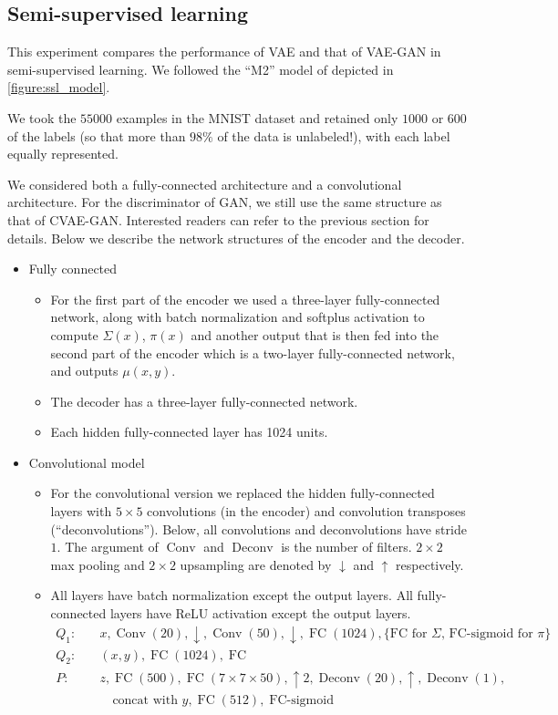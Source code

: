 \documentclass[10pt]{article}
\newcommand{\op}[1]{\operatorname{#1}}
\begin{document}
\subsection{Semi-supervised learning}

This experiment compares the performance of VAE and that of VAE-GAN in semi-supervised learning. We followed the ``M2'' model of \cite{kingma2014semi} depicted in \autoref{figure:ssl_model}. 

We took the $55000$ examples in the MNIST dataset and retained only $1000$ or $600$ of the labels (so that more than $98\%$ of the data is unlabeled!), with each label equally represented. 

We considered both a fully-connected architecture and a convolutional architecture. For the discriminator of GAN, we still use the same structure as that of CVAE-GAN. Interested readers can refer to the previous section for details. Below we describe the network structures of the encoder and the decoder. 
\begin{itemize}
	\item Fully connected
    \begin{itemize}
    	\item For the first part of the encoder we used a three-layer fully-connected network, along with batch normalization and softplus activation to compute $\Sigma(x)$, $\pi(x)$ and another output that is then fed into the second part of the encoder which is a two-layer fully-connected network, and outputs $\mu(x,y)$.
        \item The decoder has a three-layer fully-connected network.
        \item Each hidden fully-connected layer has 1024 units.
    \end{itemize}
    \item Convolutional model
    \begin{itemize}
    	\item For the convolutional version we replaced the hidden fully-connected layers with $5\times 5$ convolutions (in the encoder) and convolution transposes (``deconvolutions''). Below, all convolutions and deconvolutions have stride $1$. The argument of $\op{Conv}$ and $\op{Deconv}$ is the number of filters. $2\times 2$ max pooling and $2\times 2$ upsampling are denoted by $\downarrow$ and $\uparrow$ respectively.
        \item All layers have batch normalization except the output layers. All fully-connected layers have ReLU activation except the output layers.
        \begin{align}
        Q_1:& \quad x,\op{Conv}(20), \downarrow, \op{Conv}(50), \downarrow, \op{FC}(1024), \{\text{FC for $\Sigma$, FC-sigmoid for $\pi$}\}\\
        Q_2:& \quad (x,y), \op{FC}(1024), \op{FC}\\
        P:& \quad z,\op{FC}(500),\op{FC}(7 \times 7 \times 50), \uparrow 2,\op{Deconv}(20), \uparrow, \op{Deconv}(1),\\
        &\qquad \text{concat with $y$},  \op{FC}(512), \op{FC-sigmoid}
        \end{align}
     \end{itemize}
\end{itemize}
\end{document}

